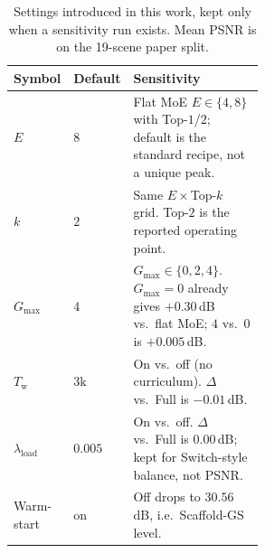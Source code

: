 \begin{table}[t]
\centering
\caption{Settings introduced in this work, kept only when a sensitivity run exists.
Mean PSNR is on the 19-scene paper split.}
\label{tab:hparams}
\setlength{\tabcolsep}{4pt}
\small
\begin{tabular}{llp{0.55\linewidth}}
\toprule
Symbol & Default & Sensitivity \\
\midrule
$E$ & $8$ & Flat MoE $E\in\{4,8\}$ with Top-$1$/$2$; default is the standard recipe, not a unique peak. \\
$k$ & $2$ & Same $E{\times}$Top-$k$ grid. Top-$2$ is the reported operating point. \\
$G_{\max}$ & $4$ & $G_{\max}\in\{0,2,4\}$. $G_{\max}{=}0$ already gives $+0.30$\,dB vs.\ flat MoE; $4$ vs.\ $0$ is $+0.005$\,dB. \\
$T_{\mathrm{w}}$ & $3\mathrm{k}$ & On vs.\ off (no curriculum). $\Delta$ vs.\ Full is $-0.01$\,dB. \\
$\lambda_{\mathrm{load}}$ & $0.005$ & On vs.\ off. $\Delta$ vs.\ Full is $0.00$\,dB; kept for Switch-style balance, not PSNR. \\
Warm-start & on & Off drops to $30.56$\,dB, i.e.\ Scaffold-GS level. \\
\bottomrule
\end{tabular}
\end{table}
